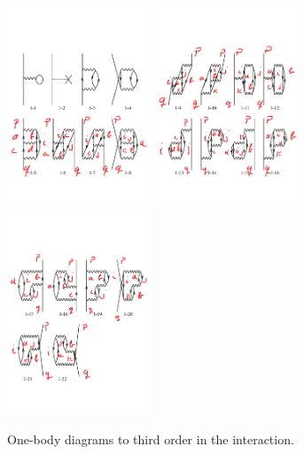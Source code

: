 \documentclass[aps,preprint,amsmath,amssymb]{revtex4-1}
\begin{document}
\begin{figure}%
     \begin{center}
            \includegraphics[width=0.38\textwidth]{onebd1.pdf}
            \includegraphics[width=0.38\textwidth]{onebd2.pdf}
            \includegraphics[width=0.38\textwidth]{onebd3.pdf}
    \end{center}
    \caption{One-body diagrams to third order in the interaction.}
\end{figure}
\end{document}
